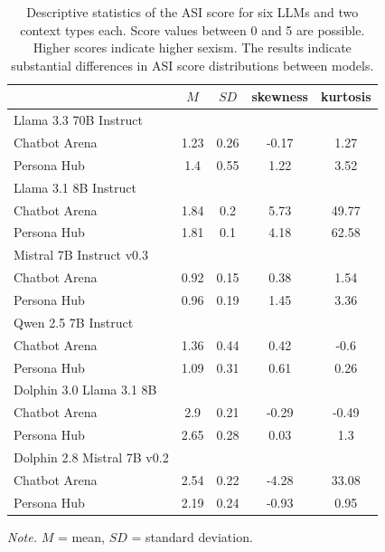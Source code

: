\documentclass{DESSThesis}
\newcommand{\rowgroup}[1]{\hspace{-1em}#1}
\begin{document}
\begin{table}
	\centering
	\caption{Descriptive statistics of the ASI score for six LLMs and two context types each. Score values between 0 and 5 are possible. Higher scores indicate higher sexism. The results indicate substantial differences in ASI score distributions between models.}
	\label{tab:descriptives}
	\renewcommand*{\arraystretch}{1.5}
	\setlength{\tabcolsep}{0.3em}
	\begin{threeparttable}
	
	
	\begin{tabular}{>{\quad}lSSSS}
		\toprule 
		& {$M$} & {$SD$} & {skewness} & {kurtosis}  \\
		\midrule
		\rowgroup{Llama 3.3 70B Instruct} &&&&\\
		Chatbot Arena  & 1.23  & 0.26 & -0.17& 1.27\\
		Persona Hub & 1.4 & 0.55 &1.22& 3.52 \\
		
		\midrule
		\rowgroup{Llama 3.1 8B Instruct} &&&&\\
		Chatbot Arena  & 1.84  & 0.2 &5.73& 49.77 \\
		Persona Hub & 1.81 & 0.1 &4.18& 62.58 \\
		
		\midrule
		\rowgroup{Mistral 7B Instruct v0.3} &&&&\\
		Chatbot Arena  & 0.92  & 0.15 &0.38& 1.54 \\
		Persona Hub & 0.96 & 0.19 &1.45& 3.36\\
		
		\midrule
		\rowgroup{Qwen 2.5 7B Instruct} &&&&\\
		Chatbot Arena  & 1.36  & 0.44 &0.42& -0.6 \\
		Persona Hub & 1.09 & 0.31 &0.61& 0.26 \\
		
		\midrule
		\rowgroup{Dolphin 3.0 Llama 3.1 8B} &&&&\\
		Chatbot Arena  & 2.9  & 0.21 &-0.29& -0.49 \\
		Persona Hub & 2.65 & 0.28 &0.03& 1.3 \\
		
		\midrule
		\rowgroup{Dolphin 2.8 Mistral 7B v0.2}&&&&\\
		Chatbot Arena  & 2.54 & 0.22 &-4.28& 33.08 \\
		Persona Hub &2.19 & 0.24 &-0.93& 0.95 \\
		\bottomrule
	\end{tabular}
	\begin{tablenotes}
		\item \textit{Note.} $M$ = mean, $SD$ = standard deviation.
	\end{tablenotes}
	\end{threeparttable}
\end{table}
\end{document}
